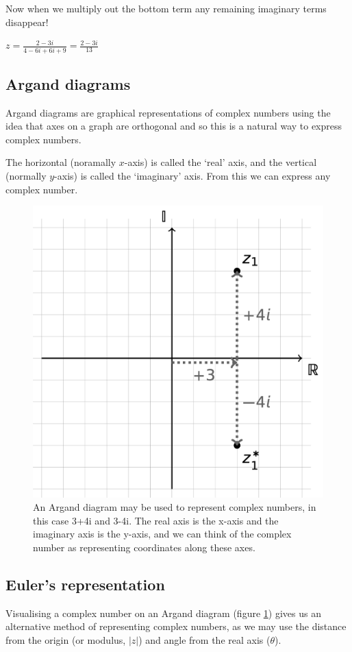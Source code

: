 \documentclass[
]{book}
\begin{document}
Now when we multiply out the bottom term any remaining imaginary terms disappear!

\(z = \frac{2-3i}{4-6i+6i+9} = \frac{2-3i}{13}\)

\hypertarget{argand-diagrams}{%
\subsection{Argand diagrams}\label{argand-diagrams}}

Argand diagrams are graphical representations of complex numbers using the idea that axes on a graph are orthogonal and so this is a natural way to express complex numbers.

The horizontal (noramally \(x\)-axis) is called the `real' axis, and the vertical (normally \(y\)-axis) is called the `imaginary' axis. From this we can express any complex number.

\begin{figure}

{\centering \includegraphics[width=0.5\linewidth]{images/argand} 

}

\caption{An Argand diagram may be used to represent complex numbers, in this case 3+4i and 3-4i. The real axis is the x-axis and the imaginary axis is the y-axis, and we can think of the complex number as representing coordinates along these axes.}\label{fig:argand}
\end{figure}

\hypertarget{eulers-representation}{%
\subsection{Euler's representation}\label{eulers-representation}}

Visualising a complex number on an Argand diagram (figure \ref{fig:argand}) gives us an alternative method of representing complex numbers, as we may use the distance from the origin (or modulus, \(|z|\)) and angle from the real axis (\(\theta\)).
\end{document}
